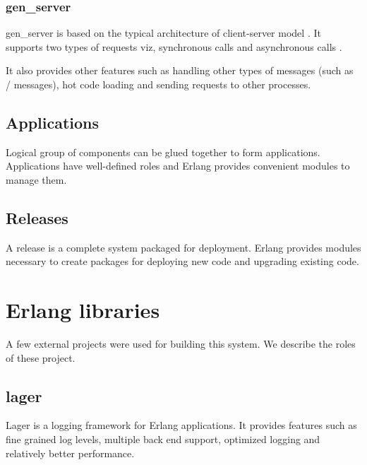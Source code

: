 \subsubsection{gen\_server}
\label{section:gen.server}

gen\_server is based on the typical architecture of client-server model
\citep{reliable.dist.sys}. It supports two types of requests viz, synchronous
calls%
and asynchronous calls%
.

It also provides other features such as handling other types of messages (such
as / messages), hot code loading and sending requests to
other processes.

\subsection{Applications}
\label{section:concepts.applications}
Logical group of components can be glued together to form applications.
Applications have well-defined roles and Erlang provides convenient modules to
manage them.

\subsection{Releases}
\label{section:concepts.releases}
A release is a complete system packaged for deployment. Erlang provides modules
necessary to create packages for deploying new code and upgrading existing code.

\section{Erlang libraries}

A few external projects were used for building this system. We describe the
roles of these project.

\subsection{lager}

Lager \citep{lager} is a logging framework for Erlang applications. It provides
features such as fine grained log levels, multiple back end support, optimized
logging and relatively better performance.

